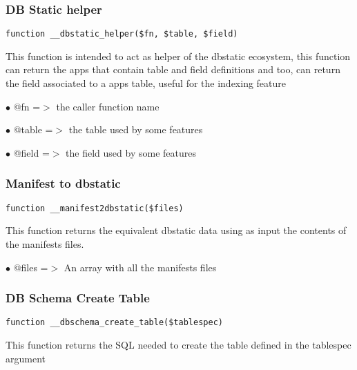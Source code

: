 \documentclass[a4paper]{article}
\begin{document}
\subsubsection{DB Static helper}

\begin{lstlisting}
function __dbstatic_helper($fn, $table, $field)
\end{lstlisting}

This function is intended to act as helper of the dbstatic ecosystem, this
function can return the apps that contain table and field definitions and
too, can return the field associated to a apps table, useful for the
indexing feature

\begin{compactitem}
\item[\color{myblue}$\bullet$] @fn    =$>$ the caller function name
\item[\color{myblue}$\bullet$] @table =$>$ the table used by some features
\item[\color{myblue}$\bullet$] @field =$>$ the field used by some features
\end{compactitem}

\hypertarget{toc428}{}
\subsubsection{Manifest to dbstatic}

\begin{lstlisting}
function __manifest2dbstatic($files)
\end{lstlisting}

This function returns the equivalent dbstatic data using as input the contents
of the manifests files.

\begin{compactitem}
\item[\color{myblue}$\bullet$] @files =$>$ An array with all the manifests files
\end{compactitem}

\hypertarget{toc429}{}
\subsubsection{DB Schema Create Table}

\begin{lstlisting}
function __dbschema_create_table($tablespec)
\end{lstlisting}

This function returns the SQL needed to create the table defined in the
tablespec argument
\end{document}
